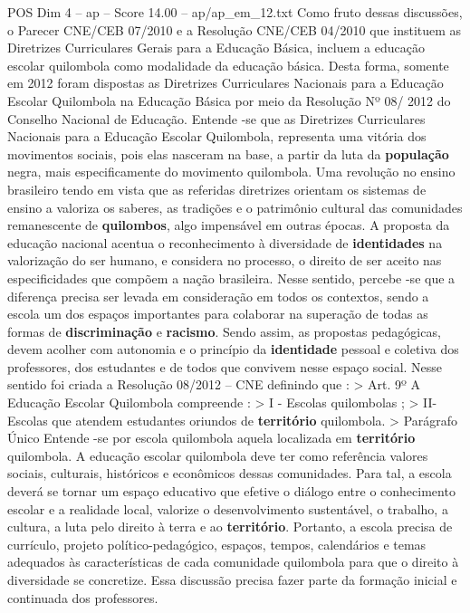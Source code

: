 \begin{textsample}{POS Dim 4 – ap – Score 14.00 – ap/ap\_em\_12.txt}
Como fruto dessas discussões, o Parecer CNE/CEB 07/2010 e a Resolução CNE/CEB 04/2010 que instituem as Diretrizes Curriculares Gerais para a Educação Básica, incluem a educação escolar quilombola como modalidade da educação básica.
Desta forma, somente em 2012 foram dispostas as Diretrizes Curriculares Nacionais para a Educação Escolar Quilombola na Educação Básica por meio da Resolução Nº 08/ 2012 do Conselho Nacional de Educação.
Entende -se que as Diretrizes Curriculares Nacionais para a Educação Escolar Quilombola, representa uma vitória dos movimentos sociais, pois elas nasceram na base, a partir da luta da \textbf{população} negra, mais especificamente do movimento quilombola.
Uma revolução no ensino brasileiro tendo em vista que as referidas diretrizes orientam os sistemas de ensino a valoriza os saberes, as tradições e o patrimônio cultural das comunidades remanescente de \textbf{quilombos}, algo impensável em outras épocas.
A proposta da educação nacional acentua o reconhecimento à diversidade de \textbf{identidades} na valorização do ser humano, e considera no processo, o direito de ser aceito nas especificidades que compõem a nação brasileira.
Nesse sentido, percebe -se que a diferença precisa ser levada em consideração em todos os contextos, sendo a escola um dos espaços importantes para colaborar na superação de todas as formas de \textbf{discriminação} e \textbf{racismo}.
Sendo assim, as propostas pedagógicas, devem acolher com autonomia e o princípio da \textbf{identidade} pessoal e coletiva dos professores, dos estudantes e de todos que convivem nesse espaço social.
Nesse sentido foi criada a Resolução 08/2012 – CNE definindo que : > Art. 9º A Educação Escolar Quilombola compreende : > I - Escolas quilombolas ; > II- Escolas que atendem estudantes oriundos de \textbf{território} quilombola. > Parágrafo Único Entende -se por escola quilombola aquela localizada em \textbf{território} quilombola.
A educação escolar quilombola deve ter como referência valores sociais, culturais, históricos e econômicos dessas comunidades.
Para tal, a escola deverá se tornar um espaço educativo que efetive o diálogo entre o conhecimento escolar e a realidade local, valorize o desenvolvimento sustentável, o trabalho, a cultura, a luta pelo direito à terra e ao \textbf{território}.
Portanto, a escola precisa de currículo, projeto político-pedagógico, espaços, tempos, calendários e temas adequados às características de cada comunidade quilombola para que o direito à diversidade se concretize.
Essa discussão precisa fazer parte da formação inicial e continuada dos professores.

\end{textsample}

